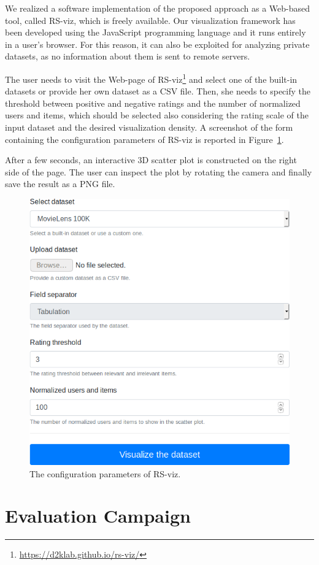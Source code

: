 We realized a software implementation of the proposed approach as a Web-based tool, called RS-viz, which is freely available. Our visualization framework has been developed using the JavaScript programming language and it runs entirely in a user's browser. For this reason, it can also be exploited for analyzing private datasets, as no information about them is sent to remote servers.

The user needs to visit the Web-page of RS-viz\footnote{\url{https://d2klab.github.io/rs-viz/}} and select one of the built-in datasets or provide her own dataset as a CSV file. Then, she needs to specify the threshold between positive and negative ratings and the number of normalized users and items, which should be selected also considering the rating scale of the input dataset and the desired visualization density. A screenshot of the form containing the configuration parameters of RS-viz is reported in Figure~\ref{viz:fig:rs-viz}.

After a few seconds, an interactive 3D scatter plot is constructed on the right side of the page. The user can inspect the plot by rotating the camera and finally save the result as a PNG file.

\begin{figure}
\centering
\includegraphics[width=.75\textwidth]{rs-viz}
\caption[Configuration of RS-viz]{The configuration parameters of RS-viz.}
\label{viz:fig:rs-viz}
\end{figure}

\section{Evaluation Campaign}
\label{viz:sec:evaluation}

